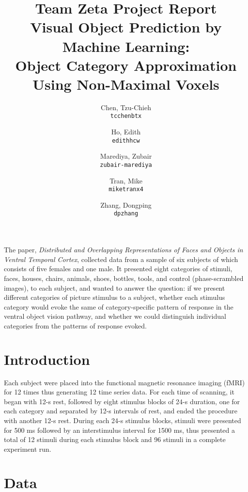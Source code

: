 \documentclass[11pt]{article}
\title{\textbf{Team Zeta Project Report}\\
Visual Object Prediction by Machine Learning:\\ 
Object Category Approximation Using Non-Maximal Voxels}
\author{
  Chen, Tzu-Chieh\\
  \texttt{tcchenbtx}
  \and
  Ho, Edith\\
  \texttt{edithhcw}
  \and
  Marediya, Zubair\\
  \texttt{zubair-marediya}
  \and
  Tran, Mike\\
  \texttt{miketranx4}
  \and
  Zhang, Dongping\\
  \texttt{dpzhang}
}
\begin{document}
\maketitle

\abstract{}

The paper, \emph{Distributed and Overlapping Representations of Faces
and Objects in Ventral Temporal Cortex}\cite{object_rec_main}, collected data 
from a sample of six subjects of which consists of five females and one male. 
It presented eight categories of stimuli, faces, houses, chairs, animals, 
shoes, bottles, tools, and control (phase-scrambled images), to each subject, 
and wanted to answer the question: if we present different categories of 
picture stimulus to a subject, whether each stimulus category would evoke the 
same of category-specific pattern of response in the ventral object vision 
pathway, and whether we could distinguish individual categories from the 
patterns of response evoked. \\

\section{Introduction}

Each subject were placed into the functional 
magnetic resonance imaging (fMRI) for 12 times thus generating 12 time series 
data. For each time of scanning, it began with 12-s rest, followed by 
eight stimulus blocks of 24-s duration, one for each category and separated by 
12-s intervals of rest, and ended the procedure with another 12-s rest. During 
each 24-s stimulus blocks, stimuli were presented for 500 ms followed by an 
interstimulus interval for 1500 ms, thus presented a total of 12 stimuli during 
each stimulus block and 96 stimuli in a complete experiment run.\\

\section{Data}
\end{document}
